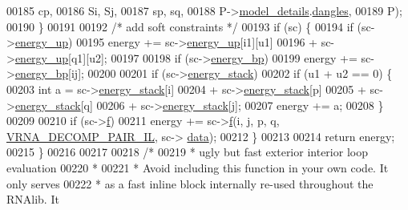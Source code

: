 \begin{DoxyCode}
00185                            cp,
00186                            Si, Sj,
00187                            sp, sq,
00188                            P->\hyperlink{group__energy__parameters_a7b84353eb9075c595bad4ceb871bcae7}{model\_details}.\hyperlink{group__model__details_adcda4ff2ea77748ae0e8700288282efc}{dangles},
00189                            P);
00190   \}
00191 
00192   \textcolor{comment}{/* add soft constraints */}
00193   \textcolor{keywordflow}{if} (sc) \{
00194     \textcolor{keywordflow}{if} (sc->\hyperlink{group__soft__constraints_a57e4dbb924ab11f304e3762a3a9b07a1}{energy\_up})
00195       energy += sc->\hyperlink{group__soft__constraints_a57e4dbb924ab11f304e3762a3a9b07a1}{energy\_up}[i1][u1]
00196                 + sc->\hyperlink{group__soft__constraints_a57e4dbb924ab11f304e3762a3a9b07a1}{energy\_up}[q1][u2];
00197 
00198     \textcolor{keywordflow}{if} (sc->\hyperlink{group__soft__constraints_ad139b8e06632e00cbcf3909815d0d03d}{energy\_bp})
00199       energy += sc->\hyperlink{group__soft__constraints_ad139b8e06632e00cbcf3909815d0d03d}{energy\_bp}[ij];
00200 
00201     \textcolor{keywordflow}{if} (sc->\hyperlink{group__soft__constraints_ac20dded6068e81acd0f1139092f66a22}{energy\_stack})
00202       \textcolor{keywordflow}{if} (u1 + u2 == 0) \{
00203         \textcolor{keywordtype}{int} a = sc->\hyperlink{group__soft__constraints_ac20dded6068e81acd0f1139092f66a22}{energy\_stack}[i]
00204                 + sc->\hyperlink{group__soft__constraints_ac20dded6068e81acd0f1139092f66a22}{energy\_stack}[p]
00205                 + sc->\hyperlink{group__soft__constraints_ac20dded6068e81acd0f1139092f66a22}{energy\_stack}[q]
00206                 + sc->\hyperlink{group__soft__constraints_ac20dded6068e81acd0f1139092f66a22}{energy\_stack}[j];
00207         energy += a;
00208       \}
00209 
00210     \textcolor{keywordflow}{if} (sc->\hyperlink{group__soft__constraints_a32dc86090237888c75491bbd4861a04b}{f})
00211       energy += sc->\hyperlink{group__soft__constraints_a32dc86090237888c75491bbd4861a04b}{f}(i, j, p, q, \hyperlink{group__constraints_gaeab04f34d7730cff2d651d782f95d857}{VRNA\_DECOMP\_PAIR\_IL}, sc->
      \hyperlink{group__soft__constraints_a7574680143df97b9029146c2150bf06d}{data});
00212   \}
00213 
00214   \textcolor{keywordflow}{return} energy;
00215 \}
00216 
00217 
00218 \textcolor{comment}{/*}
00219 \textcolor{comment}{ *  ugly but fast exterior interior loop evaluation}
00220 \textcolor{comment}{ *}
00221 \textcolor{comment}{ *  Avoid including this function in your own code. It only serves}
00222 \textcolor{comment}{ *  as a fast inline block internally re-used throughout the RNAlib. It}

\end{DoxyCode}

